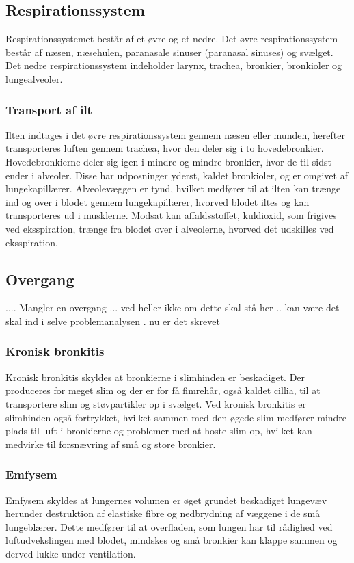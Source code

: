 \subsection{Respirationssystem}
Respirationssystemet består af et øvre og et nedre. Det øvre respirationssystem består af næsen, næsehulen, paranasale sinuser (paranasal sinuses) og svælget. Det nedre respirationssystem indeholder larynx, trachea, bronkier, bronkioler og lungealveoler. 

\subsubsection{Transport af ilt}
Ilten indtages i det øvre respirationssystem gennem næsen eller munden, herefter transporteres luften gennem trachea, hvor den deler sig i to hovedebronkier. Hovedebronkierne deler sig igen i mindre og mindre bronkier, hvor de til sidst ender i alveoler. Disse har udposninger yderst, kaldet bronkioler, og er omgivet af lungekapillærer. Alveolevæggen er tynd, hvilket medfører til at ilten kan trænge ind og over i blodet gennem lungekapillærer, hvorved blodet iltes og kan transporteres ud i musklerne. Modsat kan affaldsstoffet, kuldioxid, som frigives ved eksspiration, trænge fra blodet over i alveolerne, hvorved det udskilles ved eksspiration. 


\subsection{Overgang}
.... Mangler en overgang ... ved heller ikke om dette skal stå her .. kan være det skal ind i selve problemanalysen . nu er det skrevet


\subsubsection{Kronisk bronkitis}
Kronisk bronkitis skyldes at bronkierne i slimhinden er beskadiget. Der produceres for meget slim og der er for få fimrehår, også kaldet cillia, til at transportere slim og støvpartikler op i svælget. Ved kronisk bronkitis er slimhinden også fortrykket, hvilket sammen med den øgede slim medfører mindre plads til luft i bronkierne og problemer med at hoste slim op, hvilket kan medvirke til forsnævring af små og store bronkier. 

\subsubsection{Emfysem}
Emfysem skyldes at lungernes volumen er øget grundet beskadiget lungevæv herunder destruktion af elastiske fibre og nedbrydning af væggene i de små lungeblærer. Dette medfører til at overfladen, som lungen har til rådighed ved luftudvekslingen med blodet, mindskes og små bronkier kan klappe sammen og derved lukke under ventilation.  
